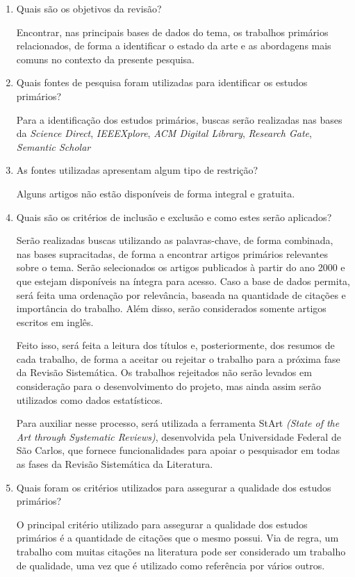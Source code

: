 \documentclass[a4paper,11pt]{article}
\begin{document}
\begin{enumerate}
\item{Quais são os objetivos da revisão?}

Encontrar, nas principais bases de dados do tema, os trabalhos primários relacionados, de forma a identificar o estado da arte e as abordagens mais comuns no contexto da presente pesquisa.

\item{Quais fontes de pesquisa foram utilizadas para identificar os estudos primários?}

Para a identificação dos estudos primários, buscas serão realizadas nas bases da \emph{Science Direct}, \emph{IEEEXplore}, \emph{ACM Digital Library}, \emph{Research Gate}, \emph{Semantic Scholar}

\item{As fontes utilizadas apresentam algum tipo de restrição?}

Alguns artigos não estão disponíveis de forma integral e gratuita. 
\item{Quais são os critérios de inclusão e exclusão e como estes serão aplicados?}

Serão realizadas buscas utilizando as palavras-chave, de forma combinada, nas bases supracitadas, de forma a encontrar artigos primários relevantes sobre o tema. Serão selecionados os artigos publicados à partir do ano 2000 e que estejam disponíveis na íntegra para acesso. Caso a base de dados permita, será feita uma ordenação por relevância, baseada na quantidade de citações e importância do trabalho. Além disso, serão considerados somente artigos escritos em inglês.

Feito isso, será feita a leitura dos títulos e, posteriormente, dos resumos de cada trabalho, de forma a aceitar ou rejeitar o trabalho para a próxima fase da Revisão Sistemática. Os trabalhos rejeitados não serão levados em consideração para o desenvolvimento do projeto, mas ainda assim serão utilizados como dados estatísticos.

Para auxiliar nesse processo, será utilizada a ferramenta StArt  \emph{(State of the Art through Systematic Reviews)}, desenvolvida pela Universidade Federal de São Carlos, que fornece funcionalidades para apoiar o pesquisador em todas as fases da Revisão Sistemática da Literatura.

\item{Quais foram os critérios utilizados para assegurar a qualidade dos estudos primários?}

O principal critério utilizado para assegurar a qualidade dos estudos primários é a quantidade de citações que o mesmo possui. Via de regra, um trabalho com muitas citações na literatura pode ser considerado um trabalho de qualidade, uma vez que é utilizado como referência por vários outros. 


\end{enumerate}
\end{document}
